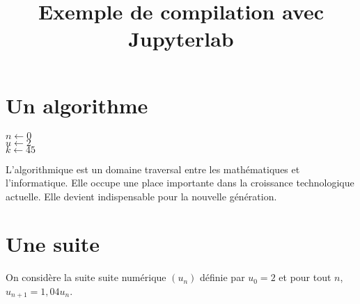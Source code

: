\documentclass[a4paper,10pt]{article}
\title{Exemple de compilation avec Jupyterlab}
\begin{document}
\date{}
\maketitle{}
\section{Un algorithme}
\begin{algorithm}
$n \leftarrow 0 $ \\
$u \leftarrow 2 $ \\
$k \leftarrow 45 $ \\
\end{algorithm}

L'algorithmique est un domaine traversal entre les mathématiques et l'informatique. Elle occupe une place importante dans la croissance technologique actuelle. Elle devient indispensable pour la nouvelle génération.

\section{Une suite}
On considère la suite suite numérique $(u_n)$ définie par $u_0=2$ et pour tout $n$,  $u_{n+1}=1,04u_n$.
\end{document}
